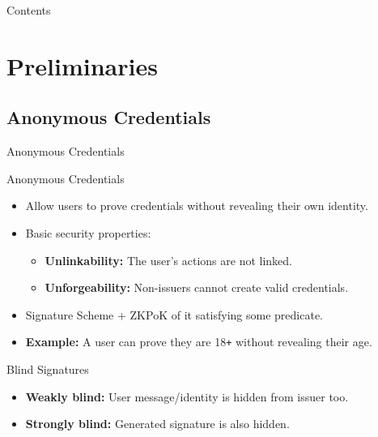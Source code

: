 \documentclass[
	xcolor={svgnames},
	hyperref={pagebackref,bookmarks},
	aspectratio=43,
]{beamer}
\begin{document}
\begin{frame}{Contents}
	\tableofcontents
\end{frame}

\section{Preliminaries}
\subsection{Anonymous Credentials}
\begin{frame}{Anonymous Credentials}
	\begin{block}{Anonymous Credentials}
		\begin{itemize}
			\item Allow users to prove credentials without revealing their own identity.
			\item Basic security properties:
			\begin{itemize}
				\item \textbf{Unlinkability:} The user's actions are not linked.
				\item \textbf{Unforgeability:} Non-issuers cannot create valid credentials.
			\end{itemize}
			\item Signature Scheme + ZKPoK of it satisfying some predicate.
			\item \textbf{Example:} A user can prove they are 18\texttt{+} without revealing their age.
		\end{itemize}
	\end{block}

	\begin{block}{Blind Signatures}
		\begin{itemize}
			\item \textbf{Weakly blind:} User message/identity is hidden from issuer too.
			\item \textbf{Strongly blind:} Generated signature is also hidden.
		\end{itemize}
	\end{block}
\end{frame}
\end{document}
